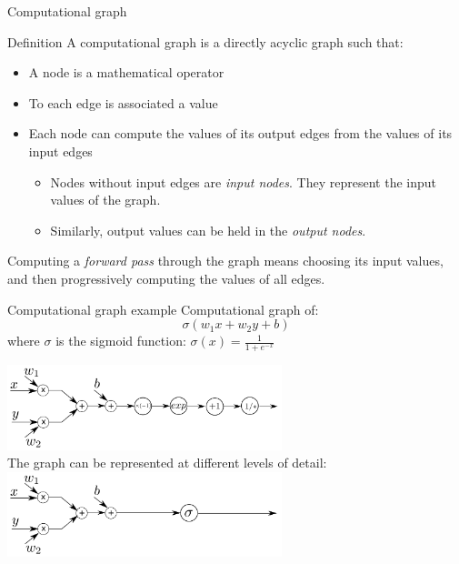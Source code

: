 \documentclass[xcolor=pdftex,dvipsnames,table,mathserif]{beamer}
\begin{document}
\begin{frame}{Computational graph}

\begin{block}{Definition}
  A computational graph is a directly acyclic graph such that:
  \begin{itemize}
  \item A node is a mathematical operator
  \item To each edge is associated a value
  \item Each node can compute the values of its output edges from the values of its input edges
    \begin{itemize}
    \item Nodes without input edges are \emph{input nodes}. They represent the input values of the graph.
    \item Similarly, output values can be held in the \emph{output nodes}.
    \end{itemize}
  \end{itemize}
\end{block}

Computing a \emph{forward pass} through the graph means choosing its input values, and then progressively computing the values of all edges.


\end{frame}


\begin{frame}{Computational graph example}
  Computational graph of:
  \[
  \sigma(w_1x + w_2y + b)
  \]
  where $\sigma$ is the sigmoid function: $\sigma(x) = \frac{1}{1 + e^{-x}}$

\vspace{3em}
\pause

  \centering
  \includegraphics[width=0.6\textwidth]{comp_graph2}\\
  \pause
  The graph can be represented at different levels of detail:
  \includegraphics[width=0.6\textwidth]{comp_graph}


\end{frame}
\end{document}
